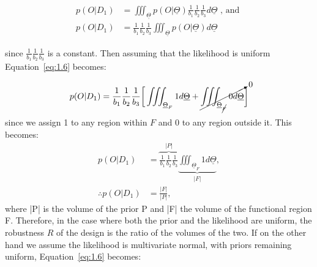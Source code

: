 \begin{align}
p(O|D_1) &= \displaystyle \iiint_{\underline{\Theta}} p(O|\underline{\Theta})\frac{1}{b_1}\frac{1}{b_2}\frac{1}{b_3}d\underline{\Theta} \text{ , and }\\
p(O|D_1) &= \frac{1}{b_1}\frac{1}{b_2}\frac{1}{b_3} \displaystyle \iiint_{\underline{\Theta}}p(O|\underline{\Theta})d\underline{\Theta} \label{eq:1.6}
\end{align}

\noindent since $\frac{1}{b_1}\frac{1}{b_2}\frac{1}{b_3} $ is a constant. Then assuming that the likelihood is uniform Equation~\ref{eq:1.6} becomes:

\begin{align}
p(O|D_1) &= \frac{1}{b_1}\frac{1}{b_2}\frac{1}{b_3} \bigg[\displaystyle \iiint_{\underline{\Theta}_F} 1 d\underline{\Theta} +\cancelto{0}{\displaystyle \iiint_{\underline{\Theta}_{\cancel{F} }} 0 d\underline{\Theta}}\bigg]  \\
\end{align}
\noindent since we assign 1 to any region within $F$ and 0 to any region outside it. This becomes:
\begin{align}
p(O|D_1) &= \overbrace{\frac{1}{b_1}\frac{1}{b_2}\frac{1}{b_3}}^{|P|} \underbrace{\displaystyle \iiint_{\underline{\Theta}_F} 1 d\underline{\Theta}}_{|F|}, \\
\therefore p(O|D_1) &= \frac{|F|}{|P|},
\end{align}
where |P| is the volume of the prior P and |F| the volume of the functional region F. Therefore, in the case where both the prior and the likelihood are uniform, the robustness $R$ of the design is the ratio of the volumes of the two. If on the other hand we assume the likelihood is multivariate normal, with priors remaining uniform, Equation~\ref{eq:1.6} becomes: 




